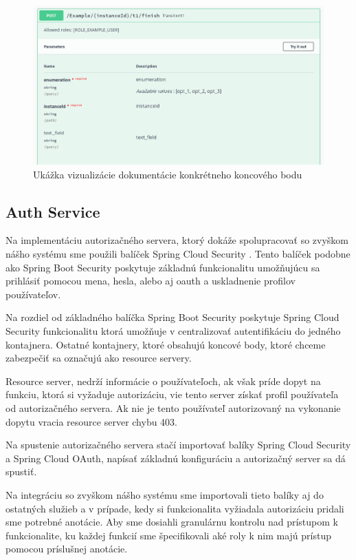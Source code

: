 \begin{figure}[!htbp]
	\centering
	\includegraphics[width=16cm]{img/swagger_ui_endpoint.png}
	\caption{Ukážka vizualizácie dokumentácie konkrétneho koncového bodu}
	\label{swagger_ui_endpoint}
\end{figure}



\subsection{Auth Service}  \label{section_auth}

Na implementáciu autorizačného servera, ktorý dokáže spolupracovať so zvyškom nášho systému sme použili balíček Spring Cloud Security \cite{cloud_security}. Tento balíček podobne ako Spring Boot Security poskytuje základnú funkcionalitu umožňujúcu sa prihlásiť pomocou mena, hesla, alebo aj \acrshort{oauth} a uskladnenie profilov používateľov.

Na rozdiel od základného balíčka Spring Boot Security poskytuje Spring Cloud Security funkcionalitu ktorá umožňuje v centralizovať autentifikáciu do jedného kontajnera. Ostatné kontajnery, ktoré obsahujú koncové body, ktoré chceme zabezpečiť sa označujú ako resource servery.

Resource server, nedrží informácie o používateľoch, ak však príde dopyt na funkciu, ktorá si vyžaduje autorizáciu, vie tento server získať profil používateľa od autorizačného servera. Ak nie je tento používateľ autorizovaný na vykonanie dopytu vracia resource server chybu 403.

Na spustenie autorizačného servera stačí importovať balíky  Spring Cloud Security a Spring Cloud OAuth, napísať základnú konfiguráciu a autorizačný server sa dá spustiť.

Na integráciu so zvyškom nášho systému sme importovali tieto balíky aj do ostatných služieb a v prípade, kedy si funkcionalita vyžiadala autorizáciu  pridali sme potrebné anotácie. Aby sme dosiahli granulárnu kontrolu nad prístupom k funkcionalite, ku každej funkcií sme špecifikovali aké roly k nim majú prístup pomocou príslušnej anotácie.

